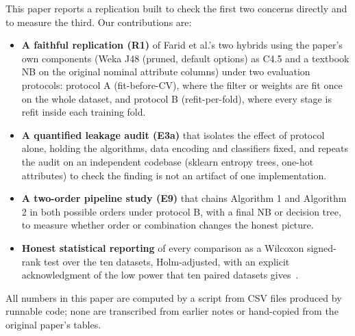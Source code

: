 This paper reports a replication built to check the first two concerns
directly and to measure the third. Our contributions are:
\begin{itemize}
\item \textbf{A faithful replication (R1)} of Farid et al.'s two hybrids
using the paper's own components (Weka J48 (pruned, default options) as
C4.5 and a textbook NB on the original nominal attribute columns) under
two evaluation protocols: protocol A (fit-before-CV), where the filter or
weights are fit once on the whole dataset, and protocol B
(refit-per-fold), where every stage is refit inside each training fold.
\item \textbf{A quantified leakage audit (E3a)} that isolates the effect of
protocol alone, holding the algorithms, data encoding and classifiers
fixed, and repeats the audit on an independent codebase (sklearn entropy
trees, one-hot attributes) to check the finding is not an artifact of one
implementation.
\item \textbf{A two-order pipeline study (E9)} that chains Algorithm 1 and
Algorithm 2 in both possible orders under protocol B, with a final NB or
decision tree, to measure whether order or combination changes the
honest picture.
\item \textbf{Honest statistical reporting} of every comparison as a
Wilcoxon signed-rank test over the ten datasets, Holm-adjusted, with an
explicit acknowledgment of the low power that ten paired
datasets gives~\cite{demsar2006statistical}.
\end{itemize}
All numbers in this paper are computed by a script from CSV files produced
by runnable code; none are transcribed from earlier notes or hand-copied
from the original paper's tables.
